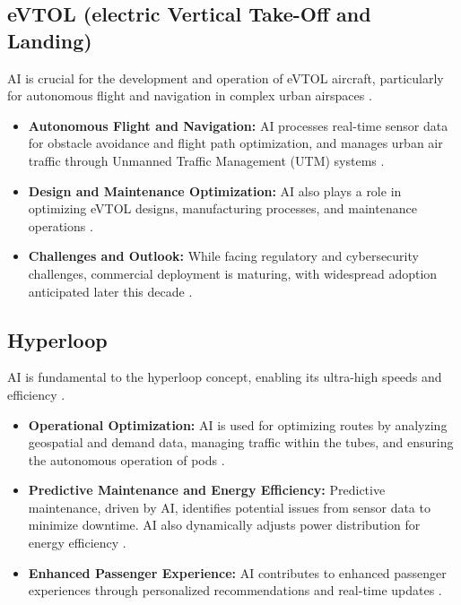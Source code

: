 \subsection{eVTOL (electric Vertical Take-Off and Landing)}
AI is crucial for the development and operation of eVTOL aircraft, particularly for autonomous flight and navigation in complex urban airspaces \cite{FlyingCarsMarket_FutureTrends}.
\begin{itemize}
    \item \textbf{Autonomous Flight and Navigation:} AI processes real-time sensor data for obstacle avoidance and flight path optimization, and manages urban air traffic through Unmanned Traffic Management (UTM) systems \cite{GlobalChange_FutureTrends, MarketsAndMarkets_FutureTrends}.
    \item \textbf{Design and Maintenance Optimization:} AI also plays a role in optimizing eVTOL designs, manufacturing processes, and maintenance operations \cite{WombleBondDickinson_FutureTrends, AddComposites_FutureTrends}.
    \item \textbf{Challenges and Outlook:} While facing regulatory and cybersecurity challenges, commercial deployment is maturing, with widespread adoption anticipated later this decade \cite{WombleBondDickinson_FutureTrends}.
\end{itemize}

\subsection{Hyperloop}
AI is fundamental to the hyperloop concept, enabling its ultra-high speeds and efficiency \cite{Meegle_FutureTrends}.
\begin{itemize}
    \item \textbf{Operational Optimization:} AI is used for optimizing routes by analyzing geospatial and demand data, managing traffic within the tubes, and ensuring the autonomous operation of pods \cite{Yenra_FutureTrends}.
    \item \textbf{Predictive Maintenance and Energy Efficiency:} Predictive maintenance, driven by AI, identifies potential issues from sensor data to minimize downtime. AI also dynamically adjusts power distribution for energy efficiency \cite{NextMSC_FutureTrends}.
    \item \textbf{Enhanced Passenger Experience:} AI contributes to enhanced passenger experiences through personalized recommendations and real-time updates \cite{TopContent_FutureTrends}.
\end{itemize}


